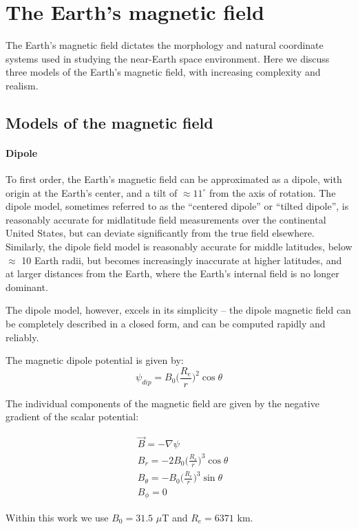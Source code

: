 \section{The Earth's magnetic field}
The Earth's magnetic field dictates the morphology and natural coordinate systems used in studying the near-Earth space environment. Here we discuss three models of the Earth's magnetic field, with increasing complexity and realism.
\subsection{Models of the magnetic field}
\paragraph{Dipole}
\label{section:dipole_model}
To first order, the Earth's magnetic field can be approximated as a dipole, with origin at the Earth's center, and a tilt of $\approx 11^\circ$ from the axis of rotation. The dipole model, sometimes referred to as the ``centered dipole'' or ``tilted dipole'', is reasonably accurate for midlatitude field measurements over the continental United States, but can deviate significantly from the true field elsewhere. Similarly, the dipole field model is reasonably accurate for middle latitudes, below $\approx$ 10 Earth radii, but becomes increasingly inaccurate at higher latitudes, and at larger distances from the Earth, where the Earth's internal field is no longer dominant.

The dipole model, however, excels in its simplicity -- the dipole magnetic field can be completely described in a closed form, and can be computed rapidly and reliably.

The magnetic dipole potential is given by:
\begin{equation}
\psi_{dip} = B_0\big(\frac{R_e}{r}\big)^2\cos\theta
\end{equation}

The individual components of the magnetic field are given by the negative gradient of the scalar potential:

\begin{eqnarray}
& \vec{B} = -\nabla \psi \\
& B_r = -2 B_0\big(\frac{R_e}{r}\big)^3\cos\theta \\
& B_{\theta} = -B_0\big(\frac{R_e}{r}\big)^3 \sin\theta \\ 
& B_\phi = 0
\end{eqnarray}

Within this work we use $B_0 = 31.5$ $\mu$T and $R_e=6371$ km.

